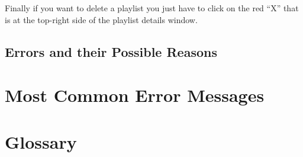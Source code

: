 Finally if you want to delete a playlist you just have to click on the red ``X''
that is at the top-right side of the playlist details window.

\newpage
\section{Errors and their Possible Reasons}

\appendix %
\chapter{Most Common Error Messages}
\thispagestyle{fancy}

\chapter{Glossary}
\thispagestyle{fancy}

